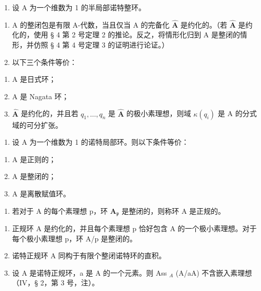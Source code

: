 
\begin{enumerate}
\def\labelenumi{\arabic{enumi})}
\tightlist
\item
  设 A 为一个维数为 1 的半局部诺特整环。
\end{enumerate}

\begin{enumerate}
\def\labelenumi{\alph{enumi})}
\item
  A 的整闭包是有限 A-代数，当且仅当 A 的完备化 \(\hat{\mathbf{A}}\) 是约化的。（若 \(\hat{\mathbf{A}}\) 是约化的，使用 § 4 第 2 号定理 2 的推论。反之，将情形化归到 A 是整闭的情形，并仿照 § 4 第 4 号定理 3 的证明进行论证。）
\item
  以下三个条件等价：
\end{enumerate}

\begin{enumerate}
\def\labelenumi{(\roman{enumi})}
\item
  A 是日式环；
\item
  A 是 Nagata 环；
\item
  \(\hat{\mathbf{A}}\) 是约化的，并且若 \(q_{1},\ldots,q_{n}\) 是 \(\hat{\mathbf{A}}\) 的极小素理想，则域 \(\kappa(q_{i})\) 是 A 的分式域的可分扩张。
\end{enumerate}

\begin{enumerate}
\def\labelenumi{\arabic{enumi})}
\setcounter{enumi}{1}
\tightlist
\item
  设 A 为一个维数为 1 的诺特局部环。则以下条件等价：
\end{enumerate}

\begin{enumerate}
\def\labelenumi{\alph{enumi})}
\item
  A 是正则的；
\item
  A 是整闭的；
\item
  A 是离散赋值环。
\end{enumerate}

\begin{enumerate}
\def\labelenumi{\arabic{enumi})}
\setcounter{enumi}{2}
\tightlist
\item
  若对于 A 的每个素理想 p，环 \(\mathbf{A}_{\mathfrak{p}}\) 是整闭的，则称环 A 是正规的。
\end{enumerate}

\begin{enumerate}
\def\labelenumi{\alph{enumi})}
\item
  正规环 A 是约化的，并且每个素理想 p 恰好包含 A 的一个极小素理想。对于每个极小素理想 p，环 A/p 是整闭的。
\item
  诺特正规环 A 同构于有限个整闭诺特环的直积。
\item
  设 A 是诺特正规环，a 是 A 的一个元素。则 Ass \(_{A}\) (A/aA) 不含嵌入素理想（IV，§ 2，第 3 号，注）。
\end{enumerate}

